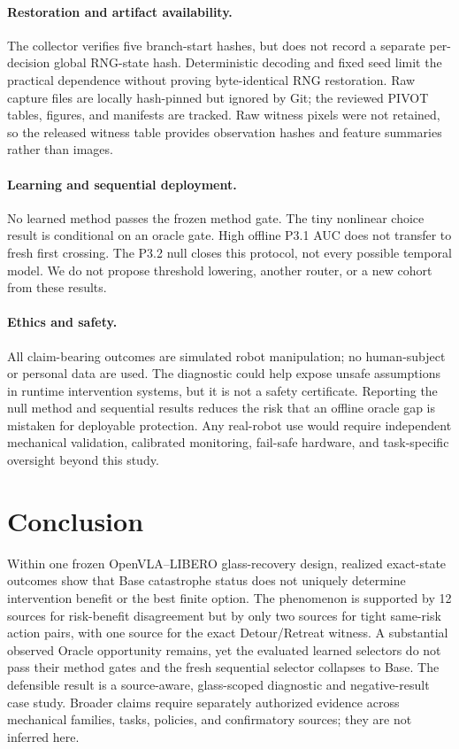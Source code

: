 \documentclass[10pt]{article}
\begin{document}
\paragraph{Restoration and artifact availability.}
The collector verifies five branch-start hashes, but does not record a separate
per-decision global RNG-state hash. Deterministic decoding and fixed seed limit
the practical dependence without proving byte-identical RNG restoration. Raw
capture files are locally hash-pinned but ignored by Git; the reviewed PIVOT
tables, figures, and manifests are tracked. Raw witness pixels were not
retained, so the released witness table provides observation hashes and feature
summaries rather than images.

\paragraph{Learning and sequential deployment.}
No learned method passes the frozen method gate. The tiny nonlinear choice
result is conditional on an oracle gate. High offline P3.1 AUC does not transfer
to fresh first crossing. The P3.2 null closes this protocol, not every possible
temporal model. We do not propose threshold lowering, another router, or a new
cohort from these results.

\paragraph{Ethics and safety.}
All claim-bearing outcomes are simulated robot manipulation; no human-subject
or personal data are used. The diagnostic could help expose unsafe assumptions
in runtime intervention systems, but it is not a safety certificate. Reporting
the null method and sequential results reduces the risk that an offline oracle
gap is mistaken for deployable protection. Any real-robot use would require
independent mechanical validation, calibrated monitoring, fail-safe hardware,
and task-specific oversight beyond this study.

\section{Conclusion}

Within one frozen OpenVLA--LIBERO glass-recovery design, realized exact-state
outcomes show that Base catastrophe status does not uniquely determine
intervention benefit or the best finite option. The phenomenon is supported by
12 sources for risk-benefit disagreement but by only two sources for tight
same-risk action pairs, with one source for the exact Detour/Retreat witness.
A substantial observed Oracle opportunity remains, yet the evaluated learned
selectors do not pass their method gates and the fresh sequential selector
collapses to Base. The defensible result is a source-aware, glass-scoped
diagnostic and negative-result case study. Broader claims require separately
authorized evidence across mechanical families, tasks, policies, and
confirmatory sources; they are not inferred here.




\clearpage
\appendix

\end{document}
